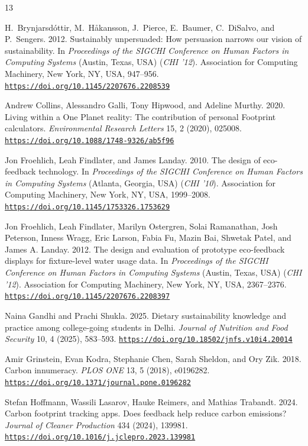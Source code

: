 \documentclass[12pt,a4paper,twocolumn]{article}
\newcommand{\doi}[1]{\href{https://doi.org/#1}{\nolinkurl{https://doi.org/#1}}}
\begin{document}
\begin{thebibliography}{13}
\scriptsize
\setlength{\itemsep}{0.3pt}

H.~Brynjarsd\'ottir, M.~H\r{a}kansson, J.~Pierce, E.~Baumer, C.~DiSalvo, and P.~Sengers. 2012. Sustainably unpersuaded: How persuasion narrows our vision of sustainability. In \emph{Proceedings of the SIGCHI Conference on Human Factors in Computing Systems} (Austin, Texas, USA) (\emph{CHI '12}). Association for Computing Machinery, New York, NY, USA, 947--956. \doi{10.1145/2207676.2208539}

Andrew Collins, Alessandro Galli, Tony Hipwood, and Adeline Murthy. 2020. Living within a One Planet reality: The contribution of personal Footprint calculators. \emph{Environmental Research Letters} 15, 2 (2020), 025008. \doi{10.1088/1748-9326/ab5f96}

Jon Froehlich, Leah Findlater, and James Landay. 2010. The design of eco-feedback technology. In \emph{Proceedings of the SIGCHI Conference on Human Factors in Computing Systems} (Atlanta, Georgia, USA) (\emph{CHI '10}). Association for Computing Machinery, New York, NY, USA, 1999--2008. \doi{10.1145/1753326.1753629}

Jon Froehlich, Leah Findlater, Marilyn Ostergren, Solai Ramanathan, Josh Peterson, Inness Wragg, Eric Larson, Fabia Fu, Mazin Bai, Shwetak Patel, and James A. Landay. 2012. The design and evaluation of prototype eco-feedback displays for fixture-level water usage data. In \emph{Proceedings of the SIGCHI Conference on Human Factors in Computing Systems} (Austin, Texas, USA) (\emph{CHI '12}). Association for Computing Machinery, New York, NY, USA, 2367--2376. \doi{10.1145/2207676.2208397}

Naina Gandhi and Prachi Shukla. 2025. Dietary sustainability knowledge and practice among college-going students in Delhi. \emph{Journal of Nutrition and Food Security} 10, 4 (2025), 583--593. \doi{10.18502/jnfs.v10i4.20014}

Amir Grinstein, Evan Kodra, Stephanie Chen, Sarah Sheldon, and Ory Zik. 2018. Carbon innumeracy. \emph{PLOS ONE} 13, 5 (2018), e0196282. \doi{10.1371/journal.pone.0196282}

Stefan Hoffmann, Wassili Lasarov, Hauke Reimers, and Mathias Trabandt. 2024. Carbon footprint tracking apps. Does feedback help reduce carbon emissions? \emph{Journal of Cleaner Production} 434 (2024), 139981. \doi{10.1016/j.jclepro.2023.139981}


\end{thebibliography}
\end{document}
